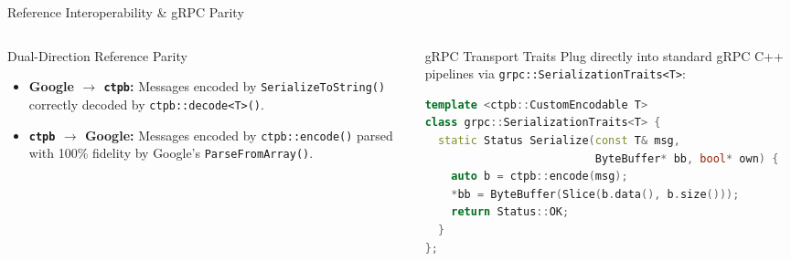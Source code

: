 \documentclass[aspectratio=169,10pt]{beamer}
\begin{document}
\begin{frame}[fragile]{Reference Interoperability \& gRPC Parity}
  \begin{columns}[T]
    \begin{column}{0.48\textwidth}
      \begin{block}{Dual-Direction Reference Parity}
        \begin{itemize}
          \item \textbf{Google $\rightarrow$ \texttt{ctpb}:} Messages encoded by \texttt{SerializeToString()} correctly decoded by \texttt{ctpb::decode<T>()}.
          \item \textbf{\texttt{ctpb} $\rightarrow$ Google:} Messages encoded by \texttt{ctpb::encode()} parsed with 100\% fidelity by Google's \texttt{ParseFromArray()}.
        \end{itemize}
      \end{block}
    \end{column}

    \begin{column}{0.48\textwidth}
      \begin{block}{gRPC Transport Traits}
        Plug directly into standard gRPC C++ pipelines via \texttt{grpc::SerializationTraits<T>}:
      \end{block}
      \begin{lstlisting}[language=C++]
template <ctpb::CustomEncodable T>
class grpc::SerializationTraits<T> {
  static Status Serialize(const T& msg, 
                          ByteBuffer* bb, bool* own) {
    auto b = ctpb::encode(msg);
    *bb = ByteBuffer(Slice(b.data(), b.size()));
    return Status::OK;
  }
};
      \end{lstlisting}
    \end{column}
  \end{columns}
\end{frame}
\end{document}

